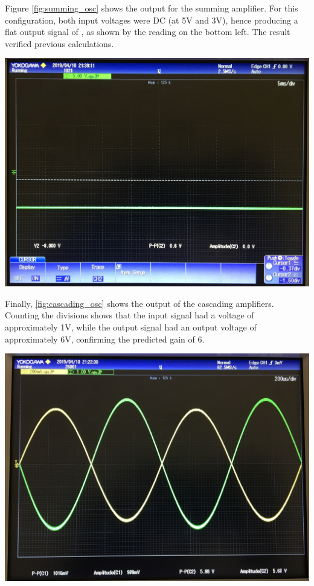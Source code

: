 \documentclass[journal]{IEEEtran}
\begin{document}
\noindent Figure \ref{fig:summing_osc} shows the output for the summing amplifier. For this configuration, both input voltages were DC (at 5V and 3V), hence producing a flat output signal of , as shown by the reading on the bottom left. The result verified previous calculations.

\begingroup
    \centering
    \medskip
    \includegraphics[width=\columnwidth]{images/lab7_summing_osc.jpg}
    \label{fig:summing_osc}
    \medskip
\endgroup

\noindent Finally, \ref{fig:cascading_osc} shows the output of the cascading amplifiers. Counting the divisions shows that the input signal had a voltage of approximately 1V, while the output signal had an output voltage of approximately 6V, confirming the predicted gain of 6.  

\begingroup
    \centering
    \medskip
    \includegraphics[width=\columnwidth]{images/lab7_cascading_osc.jpg}
    \label{fig:cascading_osc}
    \medskip
\endgroup
\end{document}
